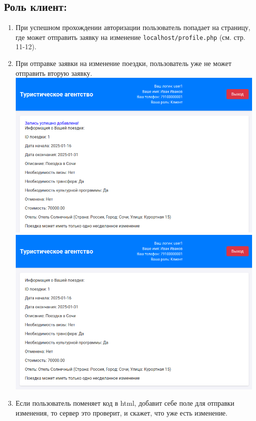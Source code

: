 \documentclass[a4paper,12pt]{article}
\begin{document}
\subsection{Роль клиент:}
\begin{enumerate}
    \item При успешном прохождении авторизации пользователь попадает на страницу, где может отправить заявку на изменение \texttt{localhost/profile.php} (см. стр. 11-12). \\
    \item При отправке заявки на изменение поездки, пользователь уже не может отправить вторую заявку. \\
          \includegraphics[scale=0.5]{media/client/success_change.png} \\
          \includegraphics[scale=0.3]{media/client/change_after_reload.png} \\
    \item Если пользователь поменяет код в html, добавит себе поле для отправки изменения, то сервер это проверит, и скажет, что уже есть изменение. \\

\end{enumerate}
\end{document}

